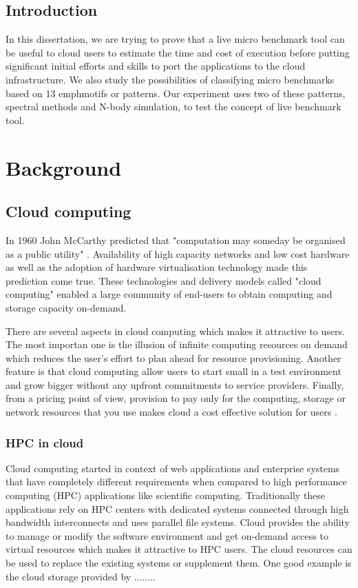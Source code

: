 \documentclass[12pt,a4paper]{report}
\begin{document}



\section{Introduction}  
In this dissertation, we are trying to prove that a live micro benchmark tool can be useful to cloud users to estimate 
the time and cost of execution before putting significant initial efforts and skills to port the applications to the cloud infrastructure. 
We also study the possibilities of classifying micro benchmarks based on 13 emph{motifs}\cite{} or patterns.  
Our experiment uses two of these patterns, spectral methods and N-body simulation, to test the concept of live benchmark tool.   

\chapter{Background}

\section{Cloud computing}  %
In 1960 John McCarthy predicted that "computation may someday be organised as a public utility" \cite {dikaiakos2009cloud}. 
Availability of high capacity networks and low cost hardware as well as the adoption of hardware virtualisation\cite{} technology 
made this prediction come true. These technologies and delivery models called "cloud computing" enabled a large community of 
end-users to obtain computing and storage capacity on-demand.  

There are several aspects in cloud computing which makes it attractive to users. The most importan one is the illusion of 
infinite computing resources on demand which reduces the user's effort to plan ahead for resource provisioning. 
Another feature is that cloud computing allow users to start small in a test environment and grow bigger without any upfront 
commitments to service providers. Finally, from a pricing point of view, provision to pay only for the computing, storage or network 
resources that you use makes cloud a cost effective solution for users \cite {armbrust2010view}.  

\subsection{HPC in cloud}  %
Cloud computing started in context of web applications and enterprise systems that have completely different requirements 
when compared to high performance computing (HPC) applications like scientific computing. Traditionally these applications rely 
on HPC centers with dedicated systems connected through high bandwidth interconnects and uses parallel file systems.   
Cloud provides the ability to manage or modify the software environment and get on-demand access to virtual resources which makes it attractive to HPC users. 
The cloud resources can be used to replace the existing systems or supplement them. 
One good example is the cloud storage provided by ........
    
\end{document}
